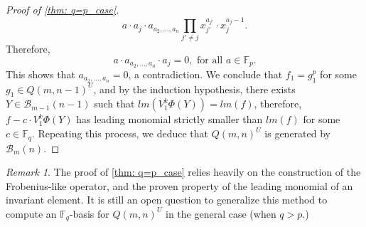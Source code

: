 \documentclass[12pt,a4paper]{report}
\theoremstyle{definition}
\theoremstyle{remark}
\newtheorem*{remark}{Remark}
\theoremstyle{definition}
\begin{document}
\begin{proof}[Proof of \cref{thm: q=p_case}]
\begin{equation*}
            a\cdot a_j\cdot a_{a_2, \ldots, a_n}\prod\limits_{j'\neq j}x_{j'}^{a_{j'}}\cdot x_j^{a_j-1}.
        \end{equation*}
        Therefore,
        \begin{equation*}
            a\cdot a_{a_2, \ldots, a_n}\cdot a_j =0, \text{ for all } a\in \mathbb{F}_p.
        \end{equation*}
        This shows that $a_{a_2, \ldots, a_n} = 0$, a contradiction. We conclude that $f_1 = g_1^p$ for some $g_1\in Q(m, n-1)^U$, and by the induction hypothesis, there exists $Y\in \mathcal{B}_{m-1}(n-1)$ such that $lm(V_1^{k}\Phi(Y)) = lm(f)$, therefore, $f-c\cdot V_1^k \Phi(Y)$ has leading monomial strictly smaller than $lm(f)$ for some $c\in \mathbb{F}_q$. Repeating this process, we deduce that $Q(m, n)^U$ is generated by $\mathcal{B}_m(n)$.
\end{proof}
\begin{remark}
    The proof of \cref{thm: q=p_case} relies heavily on the construction of the Frobenius-like operator, and the proven property of the leading monomial of an invariant element. It is still an open question to generalize this method to compute an $\mathbb{F}_q$-basis for $Q(m, n)^U$ in the general case (when $q>p$.)
\end{remark}
\end{document}
